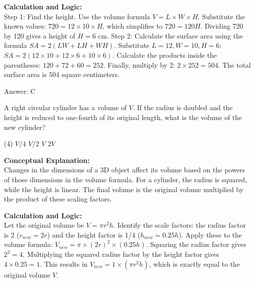 \documentclass[11pt,paper=a4,answers]{exam}
\begin{document}
\begin{questions}
\begin{solution}
\vspace{30pt}

\textbf{Calculation and Logic:} \\
Step 1: Find the height. Use the volume formula $V = L \times W \times H$. Substitute the known values: $720 = 12 \times 10 \times H$, which simplifies to $720 = 120H$. Dividing 720 by 120 gives a height of $H = 6$ cm. Step 2: Calculate the surface area using the formula $SA = 2(LW + LH + WH)$. Substitute $L=12, W=10, H=6$: $SA = 2(12 \times 10 + 12 \times 6 + 10 \times 6)$. Calculate the products inside the parentheses: $120 + 72 + 60 = 252$. Finally, multiply by 2: $2 \times 252 = 504$. The total surface area is 504 square centimeters.

\vspace{30pt}

Answer: \colorbox{yellow!100}{C}
\end{solution}

\vspace{60pt}

\question
A right circular cylinder has a volume of $V$. If the radius is doubled and the height is reduced to one-fourth of its original length, what is the volume of the new cylinder?
\begin{tasks}(4)
    \task $V/4$
    \task $V/2$
    \task $V$
    \task $2V$
\end{tasks}

\begin{solution}
\textbf{Conceptual Explanation:} \\
Changes in the dimensions of a 3D object affect its volume based on the powers of those dimensions in the volume formula. For a cylinder, the radius is squared, while the height is linear. The final volume is the original volume multiplied by the product of these scaling factors.

\vspace{30pt}

\textbf{Calculation and Logic:} \\
Let the original volume be $V = \pi r^2 h$. Identify the scale factors: the radius factor is 2 ($r_{new} = 2r$) and the height factor is 1/4 ($h_{new} = 0.25h$). Apply these to the volume formula: $V_{new} = \pi \times (2r)^2 \times (0.25h)$. Squaring the radius factor gives $2^2 = 4$. Multiplying the squared radius factor by the height factor gives $4 \times 0.25 = 1$. This results in $V_{new} = 1 \times (\pi r^2 h)$, which is exactly equal to the original volume $V$.


\end{solution}
\end{questions}
\end{document}
